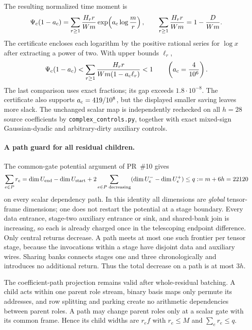 The resulting normalized time moment is
\[
 \Psi_{\rm c}(1-a_{\rm c})
   =\sum_{r\ge1}\frac{H_r r}{Wm}
          \exp\!\left(a_{\rm c}\log\frac mr\right),
 \qquad \sum_{r\ge1}\frac{H_r r}{Wm}=1-\frac D{Wm}.
\]
The certificate encloses each logarithm by the positive rational series
for $\log x$ after extracting a power of two. With upper bounds $\ell_r$,
\[
 \Psi_{\rm c}(1-a_{\rm c})
 <\sum_{r\ge1}\frac{H_r r}{Wm(1-a_{\rm c}\ell_r)}<1
 \qquad\left(a_{\rm c}=\frac4{10^6}\right).
\]
The last comparison uses exact fractions; its gap exceeds
$1.8\cdot10^{-8}$. The certificate also supports $a_{\rm c}=419/10^8$,
but the displayed smaller saving leaves more slack.
The unchanged scalar map is independently rechecked on all $h=28$ source
coefficients by \texttt{complex\_controls.py}, together with exact mixed-sign
Gaussian-dyadic and arbitrary-dirty auxiliary controls.

\paragraph{A path guard for all residual children.}
\label{sec:nested-complex-guard}
The common-gate potential argument of PR~\#10 gives
\[
 \sum_{e\in P} r_e
 =\dim U_{\rm end}-\dim U_{\rm start}
  +2\sum_{e\in P\text{ decreasing}}
       (\dim U_e^- -\dim U_e^+)
 \le q:=m+6h=22120
\]
on every scalar dependency path. In this identity all dimensions are
\emph{global} tensor-frame dimensions; one does not restart the potential
at a stage boundary. Every data entrance, stage-two auxiliary entrance or
sink, and shared-bank join is increasing, so each is already charged once
in the telescoping endpoint difference. Only central returns decrease.
A path meets at most one such frontier per tensor stage, because the
invocations within a stage have disjoint data and auxiliary wires.
Sharing banks connects stages one and three chronologically and introduces
no additional return. Thus the total decrease on a path is at most $3h$.

The coefficient-path projection remains valid after whole-residual
batching. A child acts within one parent role stream, binary basis maps
only permute its addresses, and row splitting and parking create no
arithmetic dependencies between parent roles. A path may change parent
roles only at a scalar gate with its common frame. Hence its child widths
are $r_e f$ with $r_e\le M$ and $\sum_e r_e\le q$.

